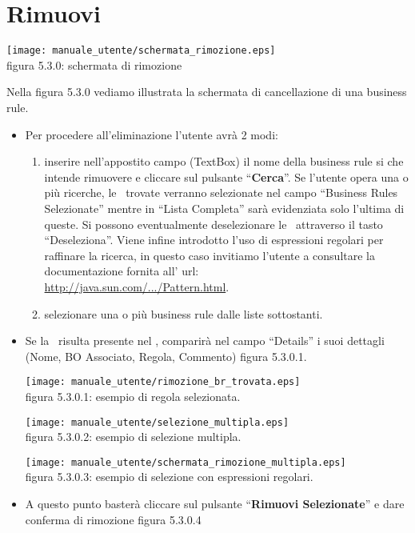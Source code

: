 \section{Rimuovi \br}
\begin{center}
\texttt{[image: manuale\_utente/schermata\_rimozione.eps]}\\
 figura 5.3.0: schermata di rimozione
\end{center}
Nella figura 5.3.0 vediamo illustrata la schermata di cancellazione di una business rule.
\begin{itemize}
\item Per procedere all'eliminazione l'utente avr\`a 2 modi:
\begin{enumerate}
\item inserire nell'appostito campo (TextBox) il nome della business rule si che intende rimuovere e cliccare sul pulsante ``\textbf{Cerca}''. Se l'utente opera una o pi\`u ricerche, le \br\ trovate verranno selezionate nel campo ``Business Rules Selezionate'' mentre in ``Lista Completa'' sar\`a evidenziata solo l'ultima di queste. Si possono eventualmente deselezionare le \br\ attraverso il tasto ``Deseleziona''. Viene infine introdotto l'uso di espressioni regolari per raffinare la ricerca, in questo caso invitiamo l'utente a consultare la documentazione fornita all' url:\\ \href{http://java.sun.com/j2se/1.4.2/docs/api/java/util/regex/Pattern.html}{http://java.sun.com/.../Pattern.html}.
\item selezionare una o pi\`u business rule dalle liste sottostanti.
\end{enumerate}

\item Se la \br\ risulta presente nel \rp, comparir\`a  nel campo ``Details'' i suoi dettagli (Nome, BO Associato, Regola, Commento) figura 5.3.0.1. 

\begin{center}
\texttt{[image: manuale\_utente/rimozione\_br\_trovata.eps]}\\
 figura 5.3.0.1: esempio di regola selezionata.
\end{center} 

\begin{center}
\texttt{[image: manuale\_utente/selezione\_multipla.eps]}\\
 figura 5.3.0.2: esempio di selezione multipla.
\end{center} 

\begin{center}
\texttt{[image: manuale\_utente/schermata\_rimozione\_multipla.eps]}\\
 figura 5.3.0.3: esempio di selezione con espressioni regolari.
\end{center} 

\item A questo punto baster\`a cliccare sul pulsante ``\textbf{Rimuovi Selezionate}'' e dare conferma di rimozione figura 5.3.0.4  
\end{itemize}


